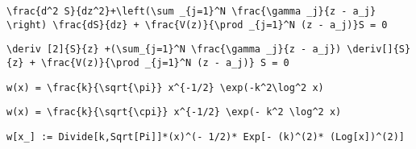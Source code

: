 \newsavebox\CPT
\begin{lrbox}{\CPT}
 \begin{minipage}[t]{0.82\textwidth}
  \lstinline[language={[latex]TeX},mathescape,breaklines=true]"\frac{d^2 S}{dz^2}+\left(\sum _{j=1}^N \frac{\gamma _j}{z - a_j} \right) \frac{dS}{dz} + \frac{V(z)}{\prod _{j=1}^N (z - a_j)}S = 0"
 \end{minipage}
\end{lrbox}
\newsavebox\CPST
\begin{lrbox}{\CPST}
 \begin{minipage}[t]{0.82\textwidth}
  \lstinline[language={[latex]TeX},mathescape,breaklines=true]"\deriv [2]{S}{z} +(\sum_{j=1}^N \frac{\gamma _j}{z - a_j}) \deriv[]{S}{z} + \frac{V(z)}{\prod _{j=1}^N (z - a_j)} S = 0"
 \end{minipage}
\end{lrbox}
\newsavebox\CPMM
\begin{lrbox}{\CPMM}
 \begin{minipage}[t]{0.82\textwidth}
  \lstinline[language={[latex]TeX},mathescape,breaklines=true]""
 \end{minipage}
\end{lrbox}
\newsavebox\CPMA
\begin{lrbox}{\CPMA}
 \begin{minipage}[t]{0.82\textwidth}
  \lstinline[language={[latex]TeX},mathescape,breaklines=true]""
 \end{minipage}
\end{lrbox}
\newsavebox\CQT
\begin{lrbox}{\CQT}
 \begin{minipage}[t]{0.82\textwidth}
  \lstinline[language={[latex]TeX},mathescape,breaklines=true]"w(x) = \frac{k}{\sqrt{\pi}} x^{-1/2} \exp(-k^2\log^2 x)"
 \end{minipage}
\end{lrbox}
\newsavebox\CQST
\begin{lrbox}{\CQST}
 \begin{minipage}[t]{0.82\textwidth}
  \lstinline[language={[latex]TeX},mathescape,breaklines=true]"w(x) = \frac{k}{\sqrt{\cpi}} x^{-1/2} \exp(- k^2 \log^2 x)"
 \end{minipage}
\end{lrbox}
\newsavebox\CQMM
\begin{lrbox}{\CQMM}
 \begin{minipage}[t]{0.82\textwidth}
  \lstinline[language={[latex]TeX},mathescape,breaklines=true]"w[x_] := Divide[k,Sqrt[Pi]]*(x)^(- 1/2)* Exp[- (k)^(2)* (Log[x])^(2)]"
 \end{minipage}
\end{lrbox}
